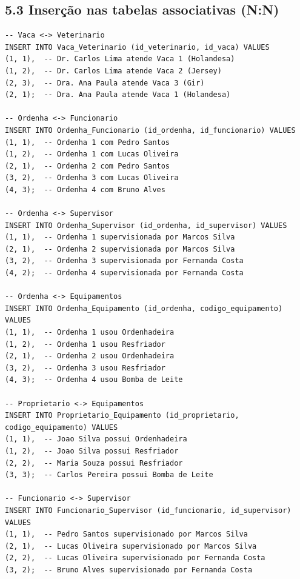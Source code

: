 \documentclass[12pt]{article}
\begin{document}
\subsection*{5.3 \enspace Inserção nas tabelas associativas (N:N)}

\begin{lstlisting}[caption={INSERT nas tabelas N:N}]
-- Vaca <-> Veterinario
INSERT INTO Vaca_Veterinario (id_veterinario, id_vaca) VALUES
(1, 1),  -- Dr. Carlos Lima atende Vaca 1 (Holandesa)
(1, 2),  -- Dr. Carlos Lima atende Vaca 2 (Jersey)
(2, 3),  -- Dra. Ana Paula atende Vaca 3 (Gir)
(2, 1);  -- Dra. Ana Paula atende Vaca 1 (Holandesa)

-- Ordenha <-> Funcionario
INSERT INTO Ordenha_Funcionario (id_ordenha, id_funcionario) VALUES
(1, 1),  -- Ordenha 1 com Pedro Santos
(1, 2),  -- Ordenha 1 com Lucas Oliveira
(2, 1),  -- Ordenha 2 com Pedro Santos
(3, 2),  -- Ordenha 3 com Lucas Oliveira
(4, 3);  -- Ordenha 4 com Bruno Alves

-- Ordenha <-> Supervisor
INSERT INTO Ordenha_Supervisor (id_ordenha, id_supervisor) VALUES
(1, 1),  -- Ordenha 1 supervisionada por Marcos Silva
(2, 1),  -- Ordenha 2 supervisionada por Marcos Silva
(3, 2),  -- Ordenha 3 supervisionada por Fernanda Costa
(4, 2);  -- Ordenha 4 supervisionada por Fernanda Costa

-- Ordenha <-> Equipamentos
INSERT INTO Ordenha_Equipamento (id_ordenha, codigo_equipamento) VALUES
(1, 1),  -- Ordenha 1 usou Ordenhadeira
(1, 2),  -- Ordenha 1 usou Resfriador
(2, 1),  -- Ordenha 2 usou Ordenhadeira
(3, 2),  -- Ordenha 3 usou Resfriador
(4, 3);  -- Ordenha 4 usou Bomba de Leite

-- Proprietario <-> Equipamentos
INSERT INTO Proprietario_Equipamento (id_proprietario, codigo_equipamento) VALUES
(1, 1),  -- Joao Silva possui Ordenhadeira
(1, 2),  -- Joao Silva possui Resfriador
(2, 2),  -- Maria Souza possui Resfriador
(3, 3);  -- Carlos Pereira possui Bomba de Leite

-- Funcionario <-> Supervisor
INSERT INTO Funcionario_Supervisor (id_funcionario, id_supervisor) VALUES
(1, 1),  -- Pedro Santos supervisionado por Marcos Silva
(2, 1),  -- Lucas Oliveira supervisionado por Marcos Silva
(2, 2),  -- Lucas Oliveira supervisionado por Fernanda Costa
(3, 2);  -- Bruno Alves supervisionado por Fernanda Costa
\end{lstlisting}

\vspace{0.5cm}

\end{document}
